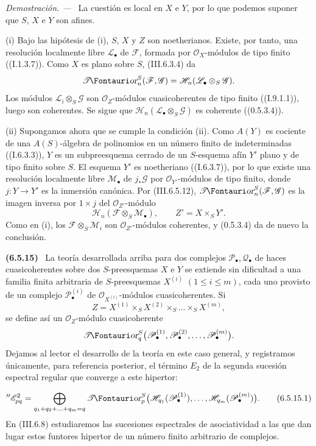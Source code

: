\documentclass[10pt,oneside]{book}
\makeatletter
\newcommand{\sh}[1]{\mathscr{#1}}
\newcommand*{\ega@sheafop}[3]{\sh{#1}#2\textup{\kern-2.2pt{\Fontauri\slshape #3}}}
\newcommand{\shTor}{\ega@sheafop{T}{}{or}}
\newcommand{\sref}[2][]{\textup{(#2)}}
\newcommand{\oldpage}[2][]{\setcounter{footnote}{0}\marginpar{\scriptsize\textbf{#1}~|~#2}\ignorespaces}
\newenvironment{env}[1][]{\par\medskip\noindent\textbf{(#1)}\ }{\par}
\newenvironment{proof}{\par\medskip\noindent\textit{Demostración. ---\ }}{\par}
\makeatother
\begin{document}
\begin{proof}
La cuestión es local en $X$ e $Y$, por lo que podemos suponer que
$S$, $X$ e $Y$ son afines.

\textnormal{(i)} Bajo las hipótesis de (i), $S$, $X$ y $Z$ son
noetherianos. Existe, por tanto, una resolución localmente libre
$\sh L_\bullet$ de $\sh F$, formada por $\sh O_X$-módulos de
tipo finito (\sref[I]{I.1.3.7}). Como $X$ es plano sobre $S$,
\sref{III.6.3.4} da
\[
  \shTor_n^S(\sh F,\sh G)
  =
  \sh H_n(\sh L_\bullet\otimes_S\sh G).
\]
Los módulos $\sh L_i\otimes_S\sh G$ son
$\sh O_Z$-módulos cuasicoherentes de tipo finito
(\sref[I]{I.9.1.1}), luego son coherentes. Se sigue que
$\sh H_n(\sh L_\bullet\otimes_S\sh G)$ es coherente
(\sref[0]{0.5.3.4}).

\textnormal{(ii)} Supongamos ahora que se cumple la condición
(ii). Como $A(Y)$ es cociente de una $A(S)$-álgebra de polinomios
en un número finito de indeterminadas (\sref[I]{I.6.3.3}), $Y$ es
un subpreesquema cerrado de un $S$-esquema afín $Y'$ plano y de
tipo finito sobre $S$. El esquema $Y'$ es noetheriano
(\sref[I]{I.6.3.7}), por lo que existe una resolución localmente
libre $\sh M_\bullet$ de $j_*\sh G$ por
$\sh O_{Y'}$-módulos de tipo finito, donde $j:Y\to Y'$ es la
inmersión canónica. Por \sref{III.6.5.12},
$\shTor_n^S(\sh F,\sh G)$ es la imagen inversa por $1\times j$
del $\sh O_{Z'}$-módulo
\[
  \sh H_n(\sh F\otimes_S\sh M_\bullet),
  \qquad Z'=X\times_SY'.
\]
Como en (i), los $\sh F\otimes_S\sh M_i$ son
$\sh O_{Z'}$-módulos coherentes, y \sref[0]{0.5.3.4} da de nuevo
la conclusión.
\end{proof}

\begin{env}[6.5.15]
\label{III.6.5.15}
La teoría desarrollada arriba para dos complejos
$\sh P_\bullet,\sh Q_\bullet$ de haces cuasicoherentes sobre dos
$S$-preesquemas $X$ e $Y$ se extiende sin dificultad a una
familia finita arbitraria de $S$-preesquemas $X^{(i)}$
$(1\leq i\leq m)$, cada uno provisto de un complejo
$\sh P_\bullet^{(i)}$ de $\sh O_{X^{(i)}}$-módulos
cuasicoherentes. Si
\[
  Z=X^{(1)}\times_SX^{(2)}\times_S\ldots\times_SX^{(m)},
\]
se define así un $\sh O_Z$-módulo cuasicoherente
\[
  \shTor_q^S
  \bigl(\sh P_\bullet^{(1)},\sh P_\bullet^{(2)},\ldots,
        \sh P_\bullet^{(m)}\bigr).
\]
Dejamos al lector el desarrollo de la teoría en este caso general,
y registramos únicamente, para referencia posterior, el término
$E_2$ de la segunda sucesión espectral regular que converge a este
hipertor:

\oldpage[III]{153}

\[
  ''\sh E_{pq}^2
  =
  \bigoplus_{q_1+q_2+\ldots+q_m=q}
  \shTor_p^S
  \bigl(
    \sh H_{q_1}(\sh P_\bullet^{(1)}),\ldots,
    \sh H_{q_m}(\sh P_\bullet^{(m)})
  \bigr).
  \tag{6.5.15.1}\label{III.6.5.15.1}
\]
En \sref{III.6.8} estudiaremos las sucesiones espectrales de
asociatividad a las que dan lugar estos funtores hipertor de un
número finito arbitrario de complejos.
\end{env}
\end{document}
